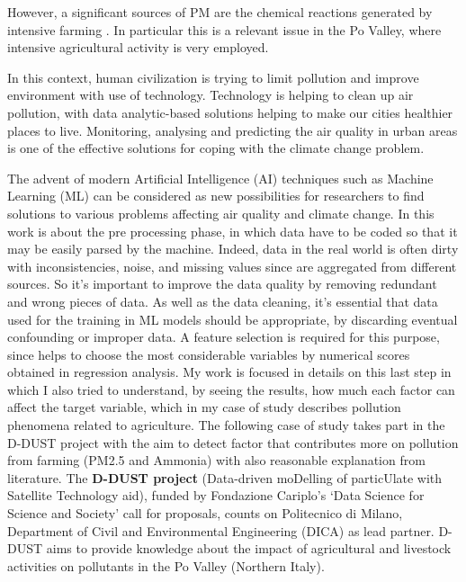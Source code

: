 However, a significant sources of PM are the chemical reactions generated by intensive farming \cite{burkart2007diffuse}.
In particular this is a relevant issue in the Po Valley, where intensive agricultural activity is very employed.\par
In this context, human civilization is trying to limit pollution and improve environment with use of technology.\newline
Technology is helping to clean up air pollution, with data analytic-based solutions helping to make our cities healthier places to live.\newline
Monitoring, analysing and predicting the air quality in urban areas is one of the effective solutions for coping with the climate change problem.\par
The advent of modern Artificial Intelligence (AI) techniques such as Machine Learning (ML) can be considered as new possibilities for researchers to find solutions to various problems affecting air quality and climate change.
\bigskip
In this work is about the pre processing phase, in which data have to be coded so that it may be easily parsed by the machine. 
Indeed, data in the real world is often dirty with inconsistencies, noise, and missing values since are aggregated from different sources. So it's important to improve the data quality by removing redundant and wrong pieces of data.
As well as the data cleaning, it's essential that data used for the training in ML models should be appropriate, by discarding eventual confounding or improper data.
A feature selection is required for this purpose, since helps to choose the most considerable variables by numerical scores obtained in regression analysis.
My work is focused in details on this last step in which I also tried to understand, by seeing the results, how much each factor can affect the target variable, which in my case of study describes pollution phenomena related to agriculture.
The following case of study takes part in the D-DUST project with the aim to detect factor that contributes more on pollution from farming (PM2.5 and Ammonia) with also reasonable explanation from literature.
The \textbf{D-DUST project} (Data-driven moDelling of particUlate with Satellite Technology aid), funded by Fondazione Cariplo’s ‘Data Science for Science and Society’ call for proposals, counts on Politecnico di Milano, Department of Civil and Environmental Engineering (DICA) as lead partner.\newline
D-DUST aims to provide knowledge about the impact of agricultural and livestock activities on pollutants in the Po Valley (Northern Italy).\par 
